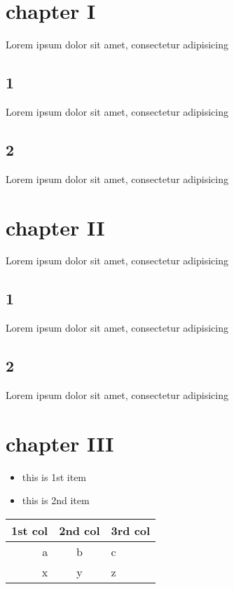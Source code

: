 \documentclass{article}
\begin{document}
 

 
\section{chapter I}
Lorem ipsum dolor sit amet, consectetur adipisicing 
\subsection{1}
Lorem ipsum dolor sit amet, consectetur adipisicing
\subsection{2}
Lorem ipsum dolor sit amet, consectetur adipisicing
\section{chapter II}
Lorem ipsum dolor sit amet, consectetur adipisicing
\subsection{1}
Lorem ipsum dolor sit amet, consectetur adipisicing
\subsection{2}
Lorem ipsum dolor sit amet, consectetur adipisicing

\section{chapter III}

\begin{itemize}
  \item this is 1st item
  \item this is 2nd item
\end{itemize}






\begin{tabular}{r|c|l}
  1st col & 2nd col & 3rd col\\
\hline  
  a & b & c \\
\hline  
  x & y & z 
\end{tabular}


 
\end{document}

